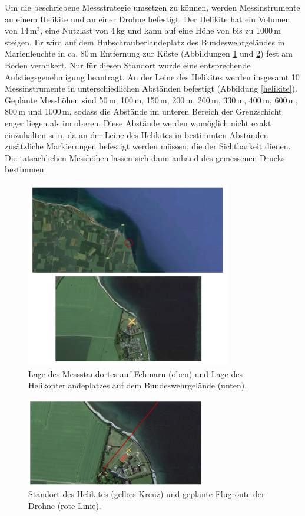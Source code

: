 \documentclass[a4paper,11pt,DIV=calc,tablecaptionabove,headinclude,twoside]{article}
\begin{document}
Um die beschriebene Messstrategie umsetzen zu können, werden Messinstrumente an einem Helikite und an einer Drohne befestigt. Der Helikite hat ein Volumen von 14\,$\text{m}^{3}$, eine Nutzlast von 4\,kg und kann auf eine Höhe von bis zu 1000\,m steigen. Er wird auf dem Hubschrauberlandeplatz des Bundeswehrgeländes in Marienleuchte in ca. 80\,m Entfernung zur Küste (Abbildungen \ref{messwiese} und \ref{flugroute_oben}) fest am Boden verankert. Nur für diesen Standort wurde eine entsprechende Aufstiegsgenehmigung beantragt. An der Leine des Helikites werden insgesamt 10 Messinstrumente in unterschiedlichen Abständen befestigt (Abbildung \ref{helikite}). Geplante Messhöhen sind 50\,m, 100\,m, 150\,m, 200\,m, 260\,m, 330\,m, 400\,m, 600\,m, 800\,m und 1000\,m, sodass die Abstände im unteren Bereich der Grenzschicht enger liegen als im oberen. Diese Abstände werden womöglich nicht exakt einzuhalten sein, da an der Leine des Helikites in bestimmten Abständen zusätzliche Markierungen befestigt werden müssen, die der Sichtbarkeit dienen. Die tatsächlichen Messhöhen lassen sich dann anhand des gemessenen Drucks bestimmen.
\begin{figure}[t]
\centering
\includegraphics[width=0.8\textwidth]{Messwiese.png}
\captionsetup{width=11cm}
\caption{Lage des Messstandortes auf Fehmarn (oben) und Lage des Helikopterlandeplatzes auf dem Bundeswehrgelände (unten).}
\label{messwiese}
\end{figure}
\begin{figure}[t]
\centering
\includegraphics[width=0.7\textwidth]{Flugroute_oben.png}
\captionsetup{width=11cm}
\caption{Standort des Helikites (gelbes Kreuz) und geplante Flugroute der Drohne (rote Linie).}
\label{flugroute_oben}
\end{figure}
\end{document}
